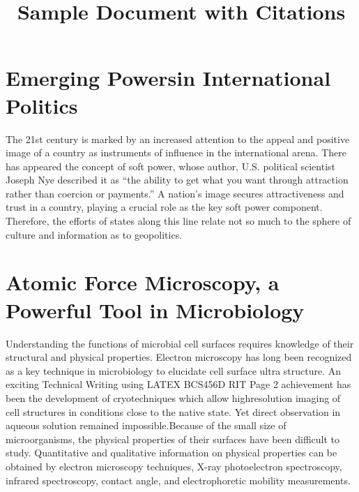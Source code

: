 \documentclass{article}
\begin{document}
\title{Sample Document with Citations}
\author{}
\date{}
\maketitle
\section{Emerging Powersin International Politics}
The 21st century is marked by an increased attention to the appeal and
positive image of a country as instruments of influence in the international
arena\cite{bohomolov2012ghost}. There has appeared the concept of soft power,
whose author, U.S\cite{sergunin2015understanding}. political scientist Joseph
Nye described it as “the ability to get what you want through attraction rather
than coercion or payments\cite{hill2006moscow}.” A nation’s image secures
attractiveness and trust in a country, playing a crucial role as the key soft power
component\cite{kiseleva2015russia}. Therefore, the efforts of states along this
line relate not so much to the sphere of culture and information as to
geopolitics\cite{kosachev2012spsecific}.
\section{Atomic Force Microscopy, a Powerful Tool in Microbiology}
Understanding the functions of microbial cell surfaces requires knowledge of
their structural and physical properties\cite{dufrene2002atomic}. Electron
microscopy has long been recognized as a key technique in microbiology to
elucidate cell surface ultra structure\cite{engel1999atomic}. An exciting
Technical Writing using LATEX BCS456D
RIT Page 2
achievement has been the development of cryotechniques which allow highresolution imaging of cell structures in conditions close to the native
state\cite{franz2008atomic}. Yet direct observation in aqueous solution remained
impossible.Because of the small size of microorganisms, the physical properties
of their surfaces have been difficult to study\cite{marrese2017atomic}.
Quantitative and qualitative information on physical properties can be obtained
by electron microscopy techniques, X-ray photoelectron spectroscopy, infrared
spectroscopy, contact angle, and electrophoretic mobility
measurements\cite{altman2015noncontact}.


\end{document}
